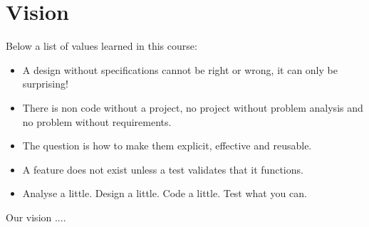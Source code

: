 \section{Vision}
Below a list of values learned in this course:
\begin{itemize}
	\item A design without specifications cannot be right or wrong, it can only be surprising!
	\item There is non code without a project, no project without problem analysis and no problem without requirements.
	\item The question is how to make them explicit, effective and reusable.
	\item A feature does not exist unless a test validates that it functions.
	\item Analyse a little. Design a little. Code a little. Test what you can.
\end{itemize}
Our vision ....
